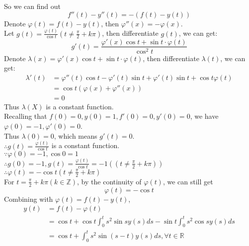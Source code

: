 \documentclass{article}
\begin{document}
So we can find out
$$f''(t)-y''(t)=-\left(f(t)-y(t)\right)$$
Denote $\varphi (t)=f(t)-y(t)$, then $\varphi ''(x)=-\varphi (x)$.\\
Let $g(t)=\frac{\varphi (t)}{\cos t} (t\neq\frac{\pi}{2}+k\pi)$,
then differentiate $g(t)$, we can get:
$$g'(t)=\frac{\varphi '(x)\cos t+\sin t\cdot \varphi (t)}{\cos^2 t}$$
Denote $\lambda (x)=\varphi '(x)\cos t+\sin t \cdot \varphi (t)$, then
differentiate $\lambda(t)$, we can get:
\begin{align*}
    \lambda'(t)&=\varphi ''(t)\cos t-\varphi '(t)\sin t+\varphi '(t)\sin t 
    +\cos t\varphi(t)\\
    &=\cos t(\varphi(x)+\varphi ''(x))\\
    &=0
\end{align*}
Thus $\lambda(X)$ is a constant function.\\
Recalling that $f(0)=0,y(0)=1,f'(0)=0,y'(0)=0$, we have
$\varphi(0)=-1,\varphi'(0)=0$. \\
Thus $\lambda(0)=0$, which means
$g'(t)=0$.\\
$\therefore g(t)=\frac{\varphi (t)}{\cos t}$ is a constant function.\\
$\because \varphi(0)=-1,\cos 0=1$\\
$\therefore g(0)=-1,g(t)=\frac{\varphi (t)}{\cos t}=-1((t\neq\frac{\pi}{2}+k\pi))$
$\therefore \varphi (t)=-\cos t(t\neq\frac{\pi}{2}+k\pi)$\\
For $t=\frac{\pi}{2}+k\pi(k\in\mathbb{Z})$, by the continuity of $\varphi (t)$, we can still get
$$\varphi (t)=-\cos t$$
Combining with $\varphi (t)=f(t)-y(t)$,
\begin{align*}
    y(t)&=f(t)-\varphi(t)\\
    &=\cos t +\cos t\int_{0}^{t}s^2\sin s y(s)ds -\sin t\int_{0}^{t}
    s^2\cos sy(s)ds\\
    &=\cos t+\int_{0}^{t}s^2\sin(s-t)y(s)ds, \forall t\in\mathbb{R}
\end{align*}
\end{document}
